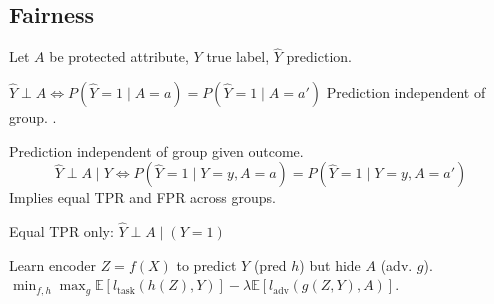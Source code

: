 \subsection{Fairness}

Let \(A\) be protected attribute, \(Y\) true label, \(\hat{Y}\) prediction.

\begin{definition}
    \( \hat{Y} \perp A \iff P(\hat{Y}=1 \mid A=a) = P(\hat{Y}=1 \mid A=a') \)
    Prediction independent of group.
    .
\end{definition}

\begin{definition}
    Prediction independent of group given outcome.
    \[ \hat{Y} \perp A \mid Y \iff P(\hat{Y}=1 \mid Y=y, A=a) = P(\hat{Y}=1 \mid Y=y, A=a') \]
    Implies equal TPR and FPR across groups.
\end{definition}

\begin{definition}
    Equal TPR only:
    \( \hat{Y} \perp A \mid (Y=1) \)
\end{definition}

\begin{definition}
    Learn encoder \(Z = f(X)\) to predict \(Y\) (pred \(h\)) but hide \(A\) (adv. \(g\)).
    \( \min_{f, h} \max_{g} \mathbb{E}[l_{\text{task}}(h(Z), Y)] - \lambda \mathbb{E}[l_{\text{adv}}(g(Z, Y), A)] \).
\end{definition}
